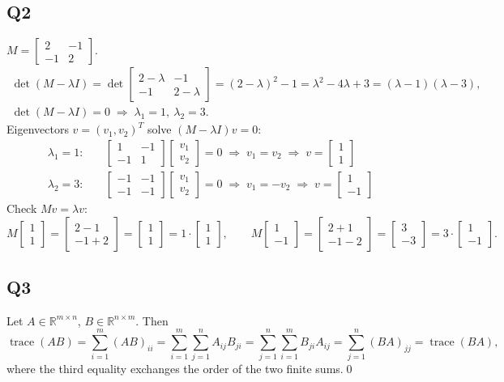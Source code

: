 \documentclass[11pt]{article}
\DeclareMathOperator{\tr}{trace}
\newcommand{\R}{\mathbb{R}}
\newcommand{\mat}[1]{\begin{bmatrix}#1\end{bmatrix}}
\begin{document}
\subsection{Q2}
$M=\mat{2&-1\\-1&2}$.
\begin{gather*}
\det(M-\lambda I)=\det\mat{2-\lambda&-1\\-1&2-\lambda}
=(2-\lambda)^2-1=\lambda^2-4\lambda+3=(\lambda-1)(\lambda-3),\\
\det(M-\lambda I)=0\;\Rightarrow\;\lambda_1=1,\ \lambda_2=3 .
\end{gather*}
Eigenvectors $v=(v_1,v_2)^T$ solve $(M-\lambda I)v=0$:
\begin{align*}
\lambda_1=1:&\quad \mat{1&-1\\-1&1}\mat{v_1\\v_2}=0
\;\Rightarrow\; v_1=v_2 \;\Rightarrow\; v=\mat{1\\1}\\[2pt]
\lambda_2=3:&\quad \mat{-1&-1\\-1&-1}\mat{v_1\\v_2}=0
\;\Rightarrow\; v_1=-v_2 \;\Rightarrow\; v=\mat{1\\-1}
\end{align*}
Check $Mv=\lambda v$:
\[
M\mat{1\\1}=\mat{2-1\\-1+2}=\mat{1\\1}=1\cdot\mat{1\\1},\qquad
M\mat{1\\-1}=\mat{2+1\\-1-2}=\mat{3\\-3}=3\cdot\mat{1\\-1} .
\]

\subsection{Q3}
Let $A\in\R^{m\times n}$, $B\in\R^{n\times m}$. Then
\[
\tr(AB)=\sum_{i=1}^{m}(AB)_{ii}=\sum_{i=1}^{m}\sum_{j=1}^{n}A_{ij}B_{ji}
=\sum_{j=1}^{n}\sum_{i=1}^{m}B_{ji}A_{ij}
=\sum_{j=1}^{n}(BA)_{jj}=\tr(BA),
\]
where the third equality exchanges the order of the two finite sums.\qed
\end{document}
